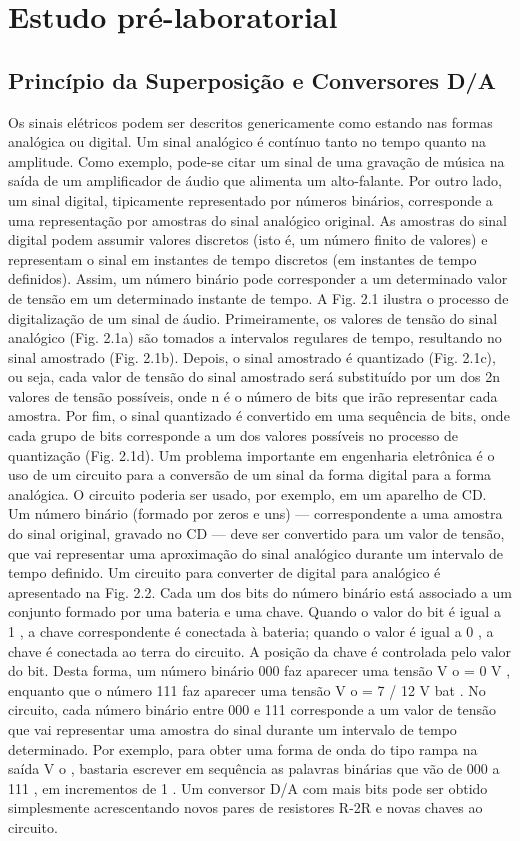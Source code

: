\section{Estudo pré-laboratorial}
\subsection{Princípio da Superposição e Conversores D/A}


Os sinais elétricos podem ser descritos genericamente como estando nas formas analógica ou digital. Um sinal analógico é contínuo tanto no tempo quanto na amplitude. Como exemplo, pode-se citar um sinal de uma gravação de música na saída de um amplificador de áudio que alimenta um alto-falante. Por outro lado, um sinal digital, tipicamente representado por números binários, corresponde a uma representação por amostras do sinal analógico original. As amostras do sinal digital podem assumir valores discretos (isto é, um número finito de valores) e representam o sinal em instantes de tempo discretos (em instantes de tempo definidos). Assim, um número binário pode corresponder a um determinado valor de tensão em um determinado instante de tempo. A Fig. 2.1 ilustra o processo de digitalização de um sinal de áudio. Primeiramente, os valores de tensão do sinal analógico (Fig. 2.1a) são tomados a intervalos regulares de tempo, resultando no sinal amostrado (Fig. 2.1b). Depois, o sinal amostrado é quantizado (Fig. 2.1c), ou seja, cada valor de tensão do sinal amostrado será substituído por um dos 2n valores de tensão possíveis, onde n é o número de bits que irão representar cada amostra. Por fim, o sinal quantizado é convertido em uma sequência de bits, onde cada grupo de bits corresponde a um dos valores possíveis no processo de quantização (Fig. 2.1d). Um problema importante em engenharia eletrônica é o uso de um circuito para a conversão de um sinal da forma digital para a forma analógica. O circuito poderia ser usado, por exemplo, em um aparelho de CD. Um número binário (formado por zeros e uns) — correspondente a uma amostra do sinal original, gravado no CD — deve ser convertido para um valor de tensão, que vai representar uma aproximação do sinal analógico durante um intervalo de tempo definido. Um circuito para converter de digital para analógico é apresentado na Fig. 2.2. Cada um dos bits do número binário está associado a um conjunto formado por uma bateria e uma chave. Quando o valor do bit é igual a 1 , a chave correspondente é conectada à bateria; quando o valor é igual a 0 , a chave é conectada ao terra do circuito. A posição da chave é controlada pelo valor do bit. Desta forma, um número binário 000 faz aparecer uma tensão V o = 0 V , enquanto que o número 111 faz aparecer uma tensão V o = 7 / 12 V bat . No circuito, cada número binário entre 000 e 111 corresponde a um valor de tensão que vai representar uma amostra do sinal durante um intervalo de tempo determinado. Por exemplo, para obter uma forma de onda do tipo rampa na saída V o , bastaria escrever em sequência as palavras binárias que vão de 000 a 111 , em incrementos de 1 . Um conversor D/A com mais bits pode ser obtido simplesmente acrescentando novos pares de resistores R-2R e novas chaves ao circuito.
